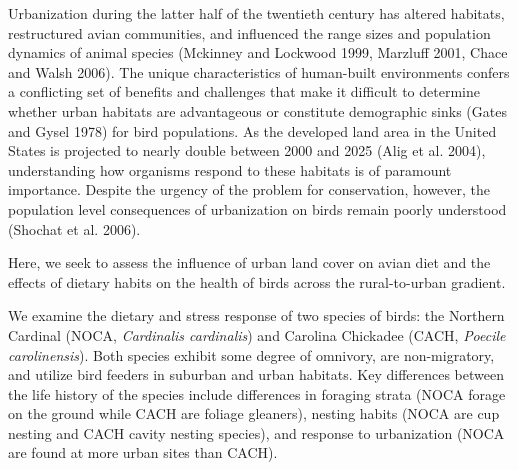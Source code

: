 \documentclass[12pt]{article}
\date{}
\begin{document}
\maketitle \vspace{-2cm}


\doublespace
{}\par
Urbanization during the latter half of the twentieth century has altered habitats, restructured avian communities, and influenced the range sizes and population dynamics of animal species (Mckinney and Lockwood 1999, Marzluff 2001, 
Chace and Walsh 2006). The unique characteristics of human-built environments confers a conflicting set of benefits and challenges that make it difficult to determine whether urban habitats are advantageous or constitute demographic 
sinks (Gates and Gysel 1978) for bird populations. As the developed land area in the United States is projected to nearly double between 2000 and 2025 (Alig et al. 2004), understanding how organisms respond to these habitats is of 
paramount importance. Despite the urgency of the problem for conservation, however, the population level consequences of urbanization on birds remain poorly understood (Shochat et al. 2006). \par


\par
Here, we seek to assess the influence of urban land cover on avian diet and the effects of dietary habits on the health of birds across the rural-to-urban gradient.


\par
We examine the dietary and stress response of two species of birds: the Northern Cardinal (NOCA, \textit{Cardinalis cardinalis}) and Carolina Chickadee (CACH, \textit{Poecile carolinensis}). Both species exhibit some degree of omnivory, 
are non-migratory, and utilize bird feeders in suburban and urban habitats. Key differences between the life history of the species include differences in foraging strata (NOCA forage on the ground while CACH are foliage gleaners), 
nesting habits (NOCA are cup nesting and CACH cavity nesting species), and response to urbanization (NOCA are found at more urban sites than CACH).

\end{document}
